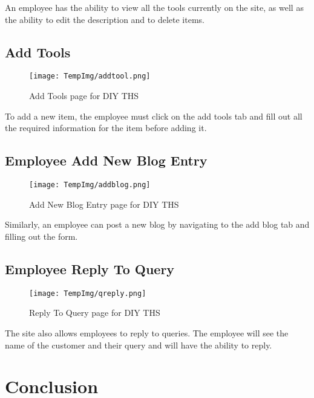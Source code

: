 \documentclass[fontsize=11pt]{extarticle}
\numberwithin{figure}{section} %
\numberwithin{table}{section}%
\begin{document}
An employee has the ability to view all the tools currently on the site,
as well as the ability to edit the description and to delete items.

\hypertarget{add-tools}{%
\subsection{Add Tools}\label{add-tools}}

\begin{figure}[H]
      \centering
      \texttt{[image: TempImg/addtool.png]}
      \caption{Add Tools page for DIY THS}
 \end{figure}

To add a new item, the employee must click on the add tools tab and fill
out all the required information for the item before adding it.

\hypertarget{employee-add-new-blog-entry}{%
\subsection{Employee Add New Blog
Entry}\label{employee-add-new-blog-entry}}

\begin{figure}[H]
      \centering
      \texttt{[image: TempImg/addblog.png]}
      \caption{Add New Blog Entry page for DIY THS}
 \end{figure}

Similarly, an employee can post a new blog by navigating to the add blog
tab and filling out the form.

\hypertarget{employee-reply-to-query}{%
\subsection{Employee Reply To Query}\label{employee-reply-to-query}}

\begin{figure}[H]
      \centering
      \texttt{[image: TempImg/qreply.png]}
      \caption{Reply To Query page for DIY THS}
 \end{figure}

The site also allows employees to reply to queries. The employee will
see the name of the customer and their query and will have the ability
to reply.

\newpage

\hypertarget{conclusion}{%
\section{Conclusion}\label{conclusion}}
\end{document}
